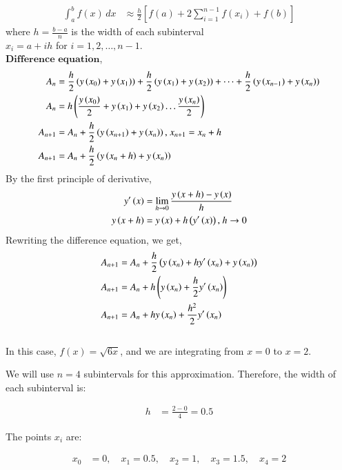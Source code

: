 \documentclass[journal]{IEEEtran}
\begin{document}
\begin{align*}
\int_a^b f(x) \, dx &\approx \frac{h}{2} \left[ f(a) + 2 \sum_{i=1}^{n-1} f(x_i) + f(b) \right]
\end{align*}
where \(h = \frac{b - a}{n}\) is the width of each subinterval\\
 \(x_i = a + ih\) for \(i = 1, 2, \dots, n-1\).\\
$\textbf{Difference equation}$,
\begin{align}
    A_n &= \frac{h}{2}\left(y\left(x_0\right) + y\left(x_1\right)\right) + \frac{h}{2}\left(y\left(x_1\right) + y\left(x_2\right)\right) + \dots + \frac{h}{2}\left(y\left(x_{n - 1}\right) + y\left(x_{n}\right)\right)\\
    A_n &= h\left(\frac{y\left(x_0\right)}{2} + y\left(x_1\right) + y\left(x_2\right) \dots \frac{y\left(x_n\right)}{2}\right)\\
    A_{n + 1} &= A_n + \frac{h}{2}\left(y\left(x_{n + 1}\right) + y\left(x_n\right)\right) \text{, } x_{n + 1} = x_n + h\\
    A_{n + 1} &= A_n + \frac{h}{2}\left(y\left(x_n + h\right) + y\left(x_n\right)\right)\\
\end{align}
By the first principle of derivative,
\begin{align}
    y^{\prime}\left(x\right) &= \lim_{h\to0} \frac{y\left(x + h\right) - y\left(x\right)}{h}\\
    y\left(x + h\right) &= y\left(x\right) + h\left(y^{\prime}\left(x\right)\right) \text{, } h\to0
\end{align}
Rewriting the difference equation, we get,
\begin{align}
    A_{n + 1} &= A_n + \frac{h}{2}\left(y\left(x_n\right) + hy^{\prime}\left(x_n\right) + y\left(x_n\right)\right)\\
    A_{n + 1} &= A_n + h\left(y\left(x_n\right) + \frac{h}{2}y^{\prime}\left(x_n\right)\right)\\
    A_{n + 1} &= A_n + hy\left(x_n\right) + \frac{h^2}{2}y^{\prime}\left(x_n\right)
\end{align}\\
In this case, \(f(x) = \sqrt{6x}\), and we are integrating from \(x = 0\) to \(x = 2\).


We will use \(n = 4\) subintervals for this approximation. Therefore, the width of each subinterval is:

\begin{align*}
h &= \frac{2 - 0}{4} = 0.5
\end{align*}

The points \(x_i\) are:

\begin{align*}
x_0 &= 0, \quad x_1 = 0.5, \quad x_2 = 1, \quad x_3 = 1.5, \quad x_4 = 2
\end{align*}
\end{document}
